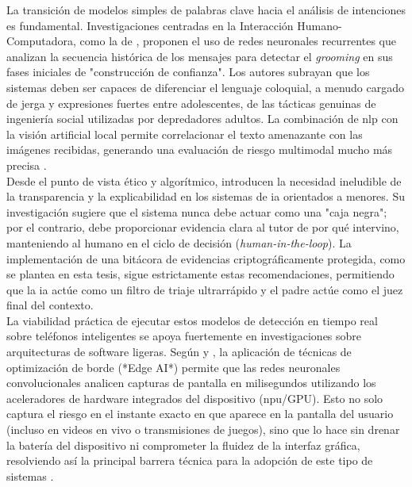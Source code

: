 La transición de modelos simples de palabras clave hacia el análisis de intenciones es fundamental. Investigaciones centradas en la Interacción Humano-Computadora, como la de \cite{razi_human-centered_2021}, proponen el uso de redes neuronales recurrentes que analizan la secuencia histórica de los mensajes para detectar el \textit{grooming} en sus fases iniciales de "construcción de confianza". Los autores subrayan que los sistemas deben ser capaces de diferenciar el lenguaje coloquial, a menudo cargado de jerga y expresiones fuertes entre adolescentes, de las tácticas genuinas de ingeniería social utilizadas por depredadores adultos. La combinación de \gls{nlp} con la visión artificial local permite correlacionar el texto amenazante con las imágenes recibidas, generando una evaluación de riesgo multimodal mucho más precisa \cite{ali_getting_2023}.\\

Desde el punto de vista ético y algorítmico, \cite{agbana_ethical_2025} introducen la necesidad ineludible de la transparencia y la explicabilidad en los sistemas de \gls{ia} orientados a menores. Su investigación sugiere que el sistema nunca debe actuar como una "caja negra"; por el contrario, debe proporcionar evidencia clara al tutor de por qué intervino, manteniendo al humano en el ciclo de decisión (\textit{human-in-the-loop}). La implementación de una bitácora de evidencias criptográficamente protegida, como se plantea en esta tesis, sigue estrictamente estas recomendaciones, permitiendo que la \gls{ia} actúe como un filtro de triaje ultrarrápido y el padre actúe como el juez final del contexto. \\

La viabilidad práctica de ejecutar estos modelos de detección en tiempo real sobre teléfonos inteligentes se apoya fuertemente en investigaciones sobre arquitecturas de software ligeras. Según \cite{ali_efficient_2021} y \cite{sahu_edge_2025}, la aplicación de técnicas de optimización de borde (*Edge AI*) permite que las redes neuronales convolucionales analicen capturas de pantalla en milisegundos utilizando los aceleradores de hardware integrados del dispositivo (\gls{npu}/GPU). Esto no solo captura el riesgo en el instante exacto en que aparece en la pantalla del usuario (incluso en videos en vivo o transmisiones de juegos), sino que lo hace sin drenar la batería del dispositivo ni comprometer la fluidez de la interfaz gráfica, resolviendo así la principal barrera técnica para la adopción de este tipo de sistemas \cite{cao_mobile_2023}.\\

